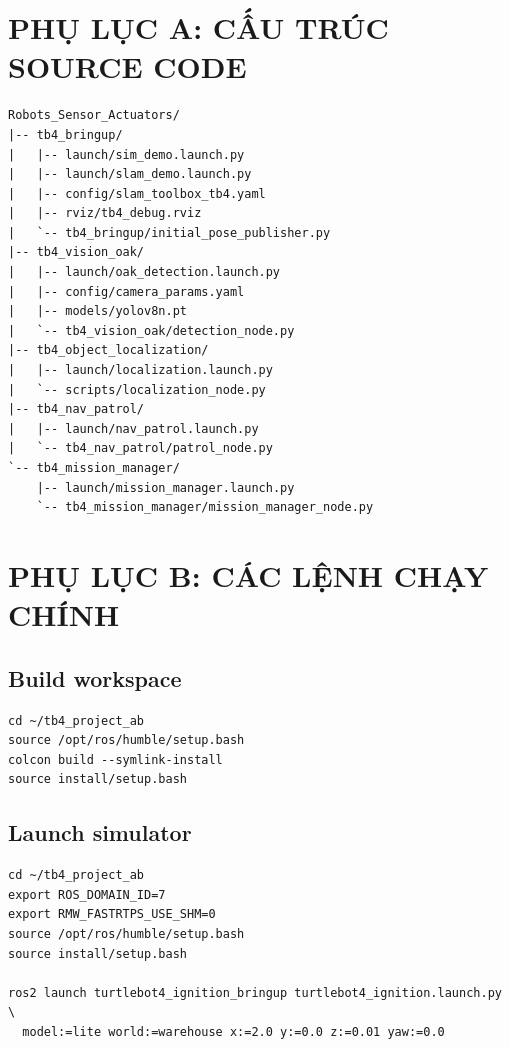 \newpage
\section*{PHỤ LỤC A: CẤU TRÚC SOURCE CODE}

\begin{lstlisting}
Robots_Sensor_Actuators/
|-- tb4_bringup/
|   |-- launch/sim_demo.launch.py
|   |-- launch/slam_demo.launch.py
|   |-- config/slam_toolbox_tb4.yaml
|   |-- rviz/tb4_debug.rviz
|   `-- tb4_bringup/initial_pose_publisher.py
|-- tb4_vision_oak/
|   |-- launch/oak_detection.launch.py
|   |-- config/camera_params.yaml
|   |-- models/yolov8n.pt
|   `-- tb4_vision_oak/detection_node.py
|-- tb4_object_localization/
|   |-- launch/localization.launch.py
|   `-- scripts/localization_node.py
|-- tb4_nav_patrol/
|   |-- launch/nav_patrol.launch.py
|   `-- tb4_nav_patrol/patrol_node.py
`-- tb4_mission_manager/
    |-- launch/mission_manager.launch.py
    `-- tb4_mission_manager/mission_manager_node.py
\end{lstlisting}

\newpage
\section*{PHỤ LỤC B: CÁC LỆNH CHẠY CHÍNH}

\subsection*{Build workspace}
\begin{lstlisting}
cd ~/tb4_project_ab
source /opt/ros/humble/setup.bash
colcon build --symlink-install
source install/setup.bash
\end{lstlisting}

\subsection*{Launch simulator}
\begin{lstlisting}
cd ~/tb4_project_ab
export ROS_DOMAIN_ID=7
export RMW_FASTRTPS_USE_SHM=0
source /opt/ros/humble/setup.bash
source install/setup.bash

ros2 launch turtlebot4_ignition_bringup turtlebot4_ignition.launch.py \
  model:=lite world:=warehouse x:=2.0 y:=0.0 z:=0.01 yaw:=0.0
\end{lstlisting}

